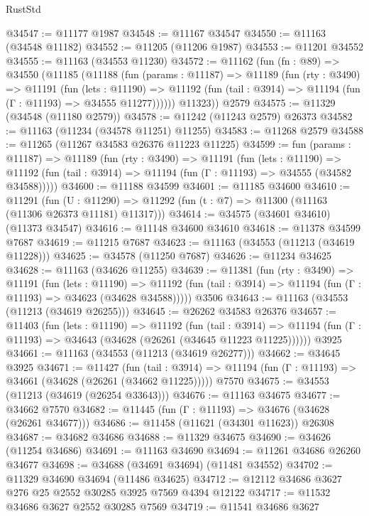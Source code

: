 \begin{lexlean}{RustStd}
\begin{coremodule}
@34547 := @11177 @1987
@34548 := @11167 @34547
@34550 := @11163 (@34548 @11182)
@34552 := @11205 (@11206 @1987)
@34553 := @11201 @34552
@34555 := @11163 (@34553 @11230)
@34572 := @11162
    (fun (fn : @89) =>
    @34550
      (@11185
        (@11188
          (fun (params : @11187) =>
          @11189
            (fun (rty : @3490) =>
            @11191
              (fun (lets : @11190) =>
              @11192 (fun (tail : @3914) => @11194 (fun (Γ : @11193) => @34555 @11277))))))
        @11323))
    @2579
@34575 := @11329 (@34548 (@11180 @2579))
@34578 := @11242 (@11243 @2579) @26373
@34582 := @11163 (@11234 (@34578 @11251) @11255)
@34583 := @11268 @2579
@34588 := @11265 (@11267 @34583 @26376 @11223 @11225)
@34599 := fun (params : @11187) =>
  @11189
    (fun (rty : @3490) =>
    @11191
      (fun (lets : @11190) =>
      @11192 (fun (tail : @3914) => @11194 (fun (Γ : @11193) => @34555 (@34582 @34588)))))
@34600 := @11188 @34599
@34601 := @11185 @34600
@34610 := @11291
    (fun (U : @11290) => @11292 (fun (t : @7) => @11300 (@11163 (@11306 @26373 @11181) @11317)))
@34614 := @34575 (@34601 @34610) (@11373 @34547)
@34616 := @11148 @34600 @34610
@34618 := @11378 @34599 @7687
@34619 := @11215 @7687
@34623 := @11163 (@34553 (@11213 (@34619 @11228)))
@34625 := @34578 (@11250 @7687)
@34626 := @11234 @34625
@34628 := @11163 (@34626 @11255)
@34639 := @11381
    (fun (rty : @3490) =>
    @11191
      (fun (lets : @11190) =>
      @11192 (fun (tail : @3914) => @11194 (fun (Γ : @11193) => @34623 (@34628 @34588)))))
    @3506
@34643 := @11163 (@34553 (@11213 (@34619 @26255)))
@34645 := @26262 @34583 @26376
@34657 := @11403
    (fun (lets : @11190) =>
    @11192
      (fun (tail : @3914) =>
      @11194 (fun (Γ : @11193) => @34643 (@34628 (@26261 (@34645 @11223 @11225))))))
    @3925
@34661 := @11163 (@34553 (@11213 (@34619 @26277)))
@34662 := @34645 @3925
@34671 := @11427
    (fun (tail : @3914) => @11194 (fun (Γ : @11193) => @34661 (@34628 (@26261 (@34662 @11225)))))
    @7570
@34675 := @34553 (@11213 (@34619 (@26254 @33643)))
@34676 := @11163 @34675
@34677 := @34662 @7570
@34682 := @11445 (fun (Γ : @11193) => @34676 (@34628 (@26261 @34677)))
@34686 := @11458 (@11621 (@34301 @11623)) @26308
@34687 := @34682 @34686
@34688 := @11329 @34675
@34690 := @34626 (@11254 @34686)
@34691 := @11163 @34690
@34694 := @11261 @34686 @26260 @34677
@34698 := @34688 (@34691 @34694) (@11481 @34552)
@34702 := @11329 @34690 @34694 (@11486 @34625)
@34712 := @12112 @34686 @3627 @276 @25 @2552 @30285 @3925 @7569 @4394 @12122
@34717 := @11532 @34686 @3627 @2552 @30285 @7569
@34719 := @11541 @34686 @3627

\end{coremodule}
\end{lexlean}
